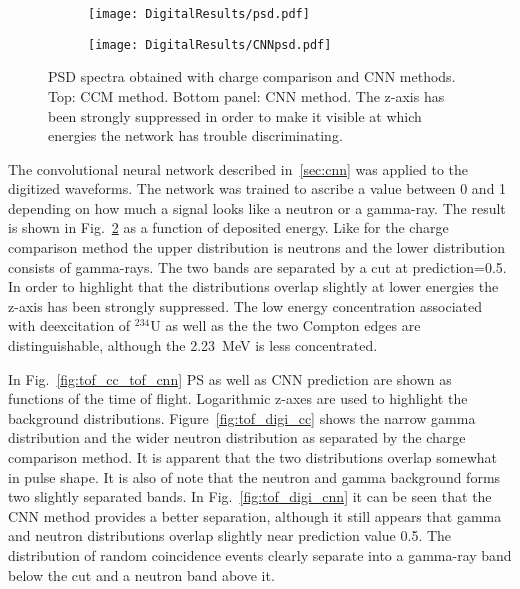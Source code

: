 \documentclass[main.tex]{subfiles}
\begin{document}
\begin{figure}
    \centering
    \begin{subfigure}[ht]{\textwidth}
    	\centering
        \texttt{[image: DigitalResults/psd.pdf]}
        \caption{}
        \label{fig:psd_d}
    \end{subfigure}
	\begin{subfigure}[ht]{\textwidth}
		\centering
        \texttt{[image: DigitalResults/CNNpsd.pdf]}
        \caption{}
    	\label{fig:cnn_E} 
    \end{subfigure}
        \caption[PSD spectra obtained with charge comparison and CNN methods.]{PSD spectra obtained with charge comparison and CNN methods. Top: CCM method. Bottom panel: CNN method. The z-axis has been strongly suppressed in order to make it visible at which energies the network has trouble discriminating.}
    \label{fig:ccm_cnn}
\end{figure}

The convolutional neural network described in~\ref{sec:cnn} was applied to the digitized waveforms. The network was trained to ascribe a value between 0 and 1 depending on how much a signal looks like a neutron or a gamma-ray. The result is shown in Fig.~\ref{fig:cnn_E} as a function of deposited energy. Like for the charge comparison method the upper distribution is neutrons and the lower distribution consists of gamma-rays. The two bands are separated by a cut at prediction=0.5. In order to highlight that the distributions overlap slightly at lower energies the z-axis has been strongly suppressed. The low energy concentration associated with deexcitation of $^\text{234}$U as well as the the two Compton edges are distinguishable, although the \SI{2.23}{\MeV} is less concentrated.



In Fig.~\ref{fig:tof_cc_tof_cnn} PS as well as CNN prediction are shown as functions of the time of flight. Logarithmic z-axes are used to highlight the background distributions. Figure~\ref{fig:tof_digi_cc} shows the narrow gamma distribution and the wider neutron distribution as separated by the charge comparison method. It is apparent that the two distributions overlap somewhat in pulse shape. It is also of note that the neutron and gamma background forms two slightly separated bands.  In Fig.~\ref{fig:tof_digi_cnn} it can be seen that the CNN method provides a better separation, although it still appears that gamma and neutron distributions overlap slightly near prediction value 0.5. The distribution of random coincidence events clearly separate into a gamma-ray band below the cut and a neutron band above it.
\end{document}
